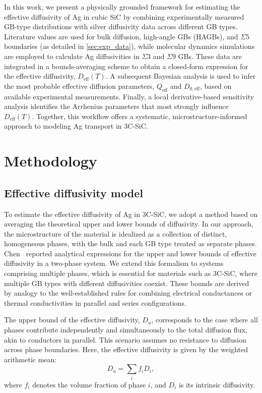 \documentclass[%
preprint,
amsmath,amssymb,
aps,
]{revtex4-2}
\newcommand{\?}{\stackrel{?}{=}}
\begin{document}
In this work, we present a physically grounded framework for estimating the effective diffusivity of Ag in cubic SiC by combining experimentally measured GB-type distributions with silver diffusivity data across different GB types. Literature values are used for bulk diffusion, high-angle GBs (HAGBs), and $\Sigma 5$ boundaries (as detailed in \cref{sec:exp_data}), while molecular dynamics simulations are employed to calculate Ag diffusivities in $\Sigma 3$ and $\Sigma 9$ GBs. These data are integrated in a bounds-averaging scheme to obtain a closed‑form expression for the effective diffusivity, $D_\text{eff}(T)$. A subsequent Bayesian analysis is used to infer the most probable effective diffusion parameters, $Q_\text{eff}$ and $D_{0,\text{eff}}$, based on available experimental measurements. Finally, a local derivative-based sensitivity analysis identifies the Arrhenius parameters that most strongly influence $D_\text{eff}(T)$. Together, this workflow offers a systematic, microstructure-informed approach to modeling Ag transport in 3C-SiC.


\section{Methodology}

\subsection{Effective diffusivity model}\label{sec:eff_diff}

To estimate the effective diffusivity of Ag in 3C-SiC, we adopt a method based on averaging the theoretical upper and lower bounds of diffusivity. In our approach, the microstructure of the material is idealized as a collection of distinct, homogeneous phases, with the bulk and each GB type treated as separate phases. Chen~\cite{ChenThesis} reported analytical expressions for the upper and lower bounds of effective diffusivity in a two-phase system. We extend this formalism to systems comprising multiple phases, which is essential for materials such as 3C-SiC, where multiple GB types with different diffusivities coexist. These bounds are derived by analogy to the well-established rules for combining electrical conductances or thermal conductivities \cite{Dong2015} in parallel and series configurations.

The upper bound of the effective diffusivity, $D_u$, corresponds to the case where all phases contribute independently and simultaneously to the total diffusion flux, akin to conductors in parallel. This scenario assumes no resistance to diffusion across phase boundaries. Here, the effective diffusivity is given by the weighted arithmetic mean:
\begin{equation}
D_u = \sum_i f_i D_i,
\label{Eq:DU}
\end{equation}
where $f_i$ denotes the volume fraction of phase $i$, and $D_i$ is its intrinsic diffusivity.
\end{document}
